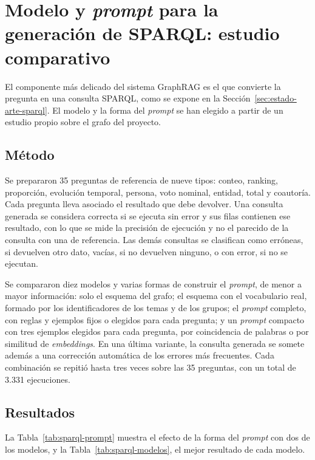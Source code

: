 \documentclass[11pt, a4paper]{report}
\begin{document}
	\section{Modelo y \textit{prompt} para la generación de SPARQL: estudio comparativo}
	\label{sec:estudio-sparql}

	El componente más delicado del sistema GraphRAG es el que convierte la
	pregunta en una consulta SPARQL, como se expone en la
	Sección~\ref{sec:estado-arte-sparql}. El modelo y la forma del \textit{prompt}
	se han elegido a partir de un estudio propio sobre el grafo del proyecto.

	\subsection{Método}

	Se prepararon 35 preguntas de referencia de nueve tipos: conteo, ranking,
	proporción, evolución temporal, persona, voto nominal, entidad, total y
	coautoría. Cada pregunta lleva asociado el resultado que debe devolver. Una
	consulta generada se considera correcta si se ejecuta sin error y sus filas
	contienen ese resultado, con lo que se mide la precisión de ejecución y no el
	parecido de la consulta con una de referencia. Las demás consultas se
	clasifican como erróneas, si devuelven otro dato, vacías, si no devuelven
	ninguno, o con error, si no se ejecutan.

	Se compararon diez modelos y varias formas de construir el \textit{prompt}, de
	menor a mayor información: solo el esquema del grafo; el esquema con el
	vocabulario real, formado por los identificadores de los temas y de los grupos;
	el \textit{prompt} completo, con reglas y ejemplos fijos o elegidos para cada
	pregunta; y un \textit{prompt} compacto con tres ejemplos elegidos para cada
	pregunta, por coincidencia de
	palabras o por similitud de \textit{embeddings}. En una última variante, la
	consulta generada se somete además a una corrección automática de los errores
	más frecuentes. Cada combinación se repitió hasta tres veces sobre las 35
	preguntas, con un total de 3.331 ejecuciones.

	\subsection{Resultados}

	La Tabla~\ref{tab:sparql-prompt} muestra el efecto de la forma del
	\textit{prompt} con dos de los modelos, y la Tabla~\ref{tab:sparql-modelos},
	el mejor resultado de cada modelo.
\end{document}
